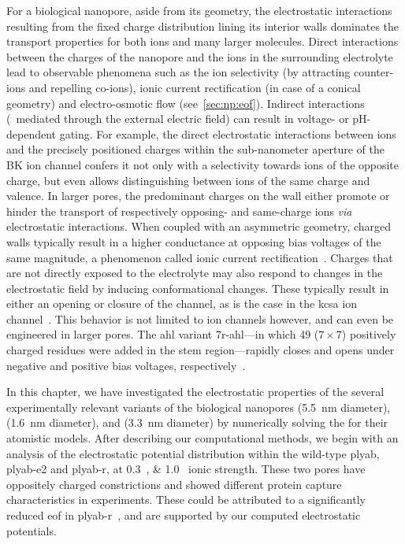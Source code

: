 For a biological nanopore, aside from its geometry, the electrostatic interactions resulting from the fixed
charge distribution lining its interior walls dominates the transport properties for both ions and many larger
molecules. Direct interactions between the charges of the nanopore and the ions in the surrounding electrolyte
lead to observable phenomena such as the ion selectivity (by attracting counter-ions and repelling co-ions),
ionic current rectification (in case of a conical geometry) and electro-osmotic flow (see~\cref{sec:np:eof}).
Indirect interactions (\ie~mediated through the external electric field) can result in voltage- or
pH-dependent gating. For example, the direct electrostatic interactions between ions and the precisely
positioned charges within the sub-nanometer aperture of the BK ion channel confers it not only with a
selectivity towards ions of the opposite charge, but even allows distinguishing between ions of the same
charge and valence. In larger pores, the predominant charges on the wall either promote or hinder the
transport of respectively opposing- and same-charge ions \textit{via} electrostatic interactions. When coupled
with an asymmetric geometry, charged walls typically result in a higher conductance at opposing bias voltages
of the same magnitude, a phenomenon called ionic current
rectification~\cite{White-2008,Lin-2015,Hsu-2017b,Valisko-2019}. Charges that are not directly exposed to the
electrolyte may also respond to changes in the electrostatic field by inducing conformational changes. These
typically result in either an opening or closure of the channel, as is the case in the \gls{kcsa} ion
channel~\cite{Kopec-2019}. This behavior is not limited to ion channels however, and can even be engineered in
larger pores. The \gls{ahl} variant \gls{7r-ahl}---in which 49 ($7\times7$) positively charged residues were
added in the stem region---rapidly closes and opens under negative and positive bias voltages,
respectively~\cite{Maglia-2009}.


In this chapter, we have investigated the electrostatic properties of the several experimentally relevant
variants of the biological nanopores  (\SI{5.5}{\nm} diameter),  (\SI{1.6}{\nm}
diameter), and  (\SI{3.3}{\nm} diameter) by numerically solving the  for their
atomistic models. After describing our computational methods, we begin with an analysis of the electrostatic
potential distribution within the wild-type \gls{plyab}, \gls{plyab-e2} and \gls{plyab-r}, at
\SIlist{0.3;1.0}{\Molar} ionic strength. These two pores have oppositely charged constrictions and showed
different protein capture characteristics in experiments. These could be attributed to a significantly reduced
\gls{eof} in \gls{plyab-r}~\cite{Huang-2020}, and are supported by our computed electrostatic potentials.

